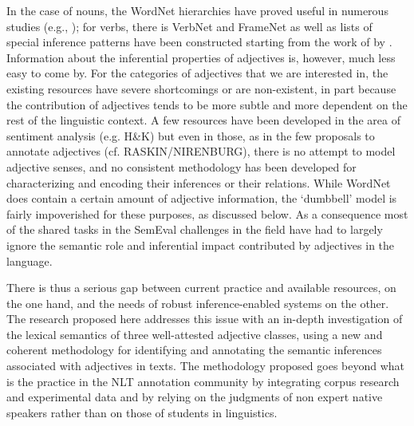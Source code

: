 \documentclass[10pt]{article}
\begin{document}
In the case of nouns, the WordNet hierarchies have proved useful in numerous studies (e.g., \cite{snow04}); for verbs, there is VerbNet and FrameNet as well as lists of special inference patterns have been constructed starting from the work of \cite{kiparsky+kiparsky:1970,karttunen:1971} by \cite{nairn+condoravdi+karttunen:2006,sauri:2008phd,factbank:2009,lotan:2012}. Information about the inferential properties of adjectives is, however, much less easy to come by. For the categories of adjectives that we are interested in, the existing resources have severe shortcomings or are non-existent, in part because the contribution of adjectives tends to be more subtle and more dependent on the rest of the linguistic context. A few resources have been developed in the area of sentiment analysis (e.g. H\&K) but even in those, as in the few proposals to annotate adjectives (cf. RASKIN/NIRENBURG), there is no attempt to model adjective senses, and no consistent methodology has been developed for characterizing and encoding their inferences or their relations. While WordNet does contain a certain amount of adjective information, the `dumbbell' model is fairly impoverished for these purposes, as discussed below. As a consequence most of the shared tasks in the SemEval challenges in the field have had to largely ignore the semantic role and inferential impact contributed by adjectives in the language.

There is thus a serious gap between current practice and available resources, on the one hand, and the needs of robust inference-enabled systems on the other. The research proposed here addresses this issue with an in-depth investigation of the lexical semantics of three well-attested adjective classes, using a new and coherent methodology for identifying and annotating the semantic inferences associated with adjectives in texts. The methodology proposed goes beyond what is the practice in the NLT annotation community by integrating corpus research and experimental data and by relying on the judgments of non expert native speakers rather than on those of students in linguistics.
\end{document}
